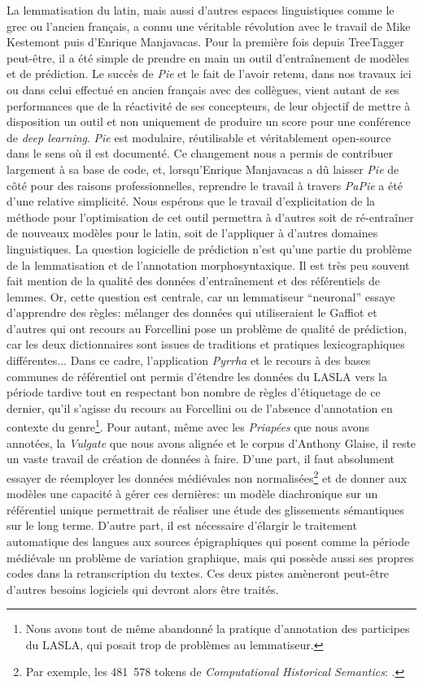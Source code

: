 La lemmatisation du latin, mais aussi d'autres espaces linguistiques comme le grec ou l'ancien français, a connu une véritable révolution avec le travail de Mike Kestemont puis d'Enrique Manjavacas. Pour la première fois depuis TreeTagger peut-être, il a été simple de prendre en main un outil d'entraînement de modèles et de prédiction. Le succès de \textit{Pie} et le fait de l'avoir retenu, dans nos travaux ici ou dans celui effectué en ancien français avec des collègues, vient autant de ses performances que de la réactivité de ses concepteurs, de leur objectif de mettre à disposition un outil et non uniquement de produire un score pour une conférence de \textit{deep learning}. \textit{Pie} est modulaire, réutilisable et véritablement open-source dans le sens où il est documenté. Ce changement nous a permis de contribuer largement à sa base de code, et, lorsqu'Enrique Manjavacas a dû laisser \textit{Pie} de côté pour des raisons professionnelles, reprendre le travail à travers \textit{PaPie} a été d'une relative simplicité. Nous espérons que le travail d'explicitation de la méthode pour l'optimisation de cet outil permettra à d'autres soit de ré-entraîner de nouveaux modèles pour le latin, soit de l'appliquer à d'autres domaines linguistiques. La question logicielle de prédiction n'est qu'une partie du problème de la lemmatisation et de l'annotation morphosyntaxique. Il est très peu souvent fait mention de la qualité des données d'entraînement et des référentiels de lemmes. Or, cette question est centrale, car un lemmatiseur \enquote{neuronal} essaye d'apprendre des règles: mélanger des données qui utiliseraient le Gaffiot et d'autres qui ont recours au Forcellini pose un problème de qualité de prédiction, car les deux dictionnaires sont issues de traditions et pratiques lexicographiques différentes... Dans ce cadre, l'application \textit{Pyrrha} et le recours à des bases communes de référentiel ont permis d'étendre les données du LASLA vers la période tardive tout en respectant bon nombre de règles d'étiquetage de ce dernier, qu'il s'agisse du recours au Forcellini ou de l'absence d'annotation en contexte du genre\footnote{Nous avons tout de même abandonné la pratique d'annotation des participes du LASLA, qui posait trop de problèmes au lemmatiseur.}. Pour autant, même avec les \textit{Priapées} que nous avons annotées, la \textit{Vulgate} que nous avons alignée et le corpus d'Anthony Glaise, il reste un vaste travail de création de données à faire. D'une part, il faut absolument essayer de réemployer les données médiévales non normalisées\footnote{Par exemple, les 481~578 tokens de \textit{Computational Historical Semantics}: \textcite{capitularies}.} et de donner aux modèles une capacité à gérer ces dernières: un modèle diachronique sur un référentiel unique permettrait de réaliser une étude des glissements sémantiques sur le long terme. D'autre part, il est nécessaire d'élargir le traitement automatique des langues aux sources épigraphiques qui posent comme la période médiévale un problème de variation graphique, mais qui possède aussi ses propres codes dans la retranscription du textes. Ces deux pistes amèneront peut-être d'autres besoins logiciels qui devront alors être traités.

